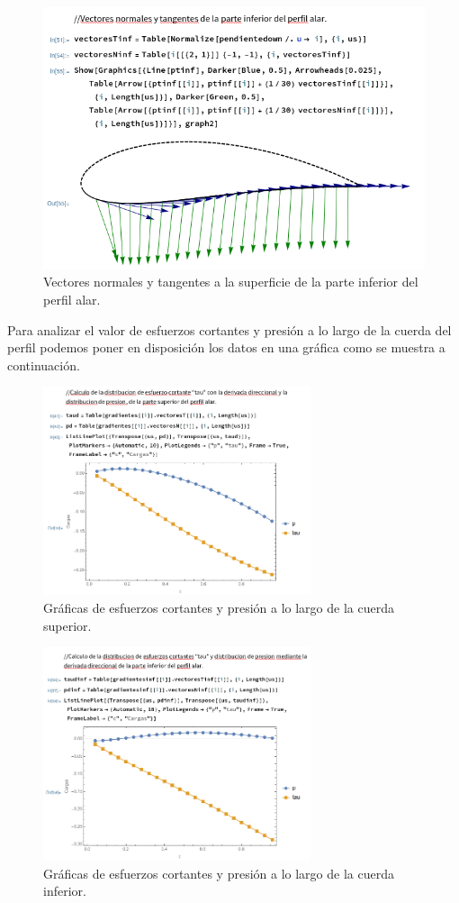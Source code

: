 \documentclass[12pt, letterpaper]{article}
\begin{document}
\begin{figure}[H]
	\centering
	\includegraphics[width=\textwidth]{16.png}
	\caption{Vectores normales y tangentes a la superficie de la parte inferior del perfil alar.}
\end{figure}

Para analizar el valor de esfuerzos cortantes y presión a lo largo de la cuerda del perfil podemos poner en disposición los datos en una gráfica como se muestra a continuación.

\begin{figure}[H]
	\centering
	\includegraphics[width=0.7\textwidth]{17.png}
	\caption{Gráficas de esfuerzos cortantes y presión a lo largo de la cuerda superior.}
\end{figure}

\begin{figure}[H]
	\centering
	\includegraphics[width=0.7\textwidth]{18.png}
	\caption{Gráficas de esfuerzos cortantes y presión a lo largo de la cuerda inferior.}
\end{figure}
\end{document}
